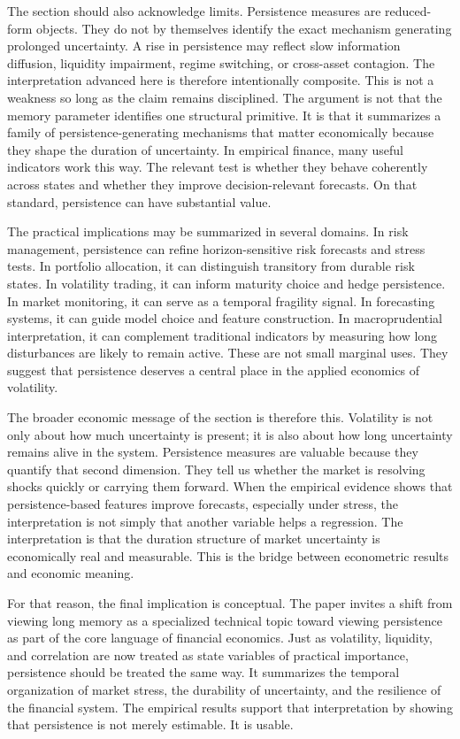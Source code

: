 \documentclass[12pt]{article}
\begin{document}
The section should also acknowledge limits. Persistence measures are reduced-form objects. They do not by themselves identify the exact mechanism generating prolonged uncertainty. A rise in persistence may reflect slow information diffusion, liquidity impairment, regime switching, or cross-asset contagion. The interpretation advanced here is therefore intentionally composite. This is not a weakness so long as the claim remains disciplined. The argument is not that the memory parameter identifies one structural primitive. It is that it summarizes a family of persistence-generating mechanisms that matter economically because they shape the duration of uncertainty. In empirical finance, many useful indicators work this way. The relevant test is whether they behave coherently across states and whether they improve decision-relevant forecasts. On that standard, persistence can have substantial value.

The practical implications may be summarized in several domains. In risk management, persistence can refine horizon-sensitive risk forecasts and stress tests. In portfolio allocation, it can distinguish transitory from durable risk states. In volatility trading, it can inform maturity choice and hedge persistence. In market monitoring, it can serve as a temporal fragility signal. In forecasting systems, it can guide model choice and feature construction. In macroprudential interpretation, it can complement traditional indicators by measuring how long disturbances are likely to remain active. These are not small marginal uses. They suggest that persistence deserves a central place in the applied economics of volatility.

The broader economic message of the section is therefore this. Volatility is not only about how much uncertainty is present; it is also about how long uncertainty remains alive in the system. Persistence measures are valuable because they quantify that second dimension. They tell us whether the market is resolving shocks quickly or carrying them forward. When the empirical evidence shows that persistence-based features improve forecasts, especially under stress, the interpretation is not simply that another variable helps a regression. The interpretation is that the duration structure of market uncertainty is economically real and measurable. This is the bridge between econometric results and economic meaning.

For that reason, the final implication is conceptual. The paper invites a shift from viewing long memory as a specialized technical topic toward viewing persistence as part of the core language of financial economics. Just as volatility, liquidity, and correlation are now treated as state variables of practical importance, persistence should be treated the same way. It summarizes the temporal organization of market stress, the durability of uncertainty, and the resilience of the financial system. The empirical results support that interpretation by showing that persistence is not merely estimable. It is usable.
\end{document}

